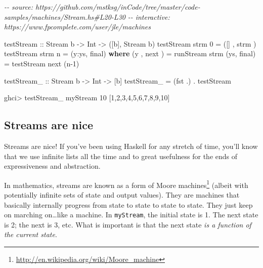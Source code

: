 \documentclass[]{article}
\newenvironment{Shaded}{}{}
\newcommand{\CommentTok}[1]{\textcolor[rgb]{0.38,0.63,0.69}{\textit{#1}}}
\newcommand{\DataTypeTok}[1]{\textcolor[rgb]{0.56,0.13,0.00}{#1}}
\newcommand{\DecValTok}[1]{\textcolor[rgb]{0.25,0.63,0.44}{#1}}
\newcommand{\FunctionTok}[1]{\textcolor[rgb]{0.02,0.16,0.49}{#1}}
\newcommand{\KeywordTok}[1]{\textcolor[rgb]{0.00,0.44,0.13}{\textbf{#1}}}
\newcommand{\NormalTok}[1]{#1}
\newcommand{\OperatorTok}[1]{\textcolor[rgb]{0.40,0.40,0.40}{#1}}
\newcommand{\OtherTok}[1]{\textcolor[rgb]{0.00,0.44,0.13}{#1}}
\renewcommand{\href}[2]{#2\footnote{\url{#1}}}
\begin{document}
\begin{Shaded}
\begin{Highlighting}[]
\CommentTok{{-}{-} source: https://github.com/mstksg/inCode/tree/master/code{-}samples/machines/Stream.hs\#L20{-}L30}
\CommentTok{{-}{-} interactive: https://www.fpcomplete.com/user/jle/machines}

\OtherTok{testStream ::} \DataTypeTok{Stream}\NormalTok{ b }\OtherTok{{-}\textgreater{}} \DataTypeTok{Int} \OtherTok{{-}\textgreater{}}\NormalTok{ ([b], }\DataTypeTok{Stream}\NormalTok{ b)}
\NormalTok{testStream strm }\DecValTok{0} \OtherTok{=}\NormalTok{ ([]  , strm )}
\NormalTok{testStream strm n }\OtherTok{=}\NormalTok{ (y}\OperatorTok{:}\NormalTok{ys, final)}
  \KeywordTok{where}
\NormalTok{    (y , next )   }\OtherTok{=}\NormalTok{ runStream  strm}
\NormalTok{    (ys, final)   }\OtherTok{=}\NormalTok{ testStream next (n}\OperatorTok{{-}}\DecValTok{1}\NormalTok{)}

\OtherTok{testStream\_ ::} \DataTypeTok{Stream}\NormalTok{ b }\OtherTok{{-}\textgreater{}} \DataTypeTok{Int} \OtherTok{{-}\textgreater{}}\NormalTok{ [b]}
\NormalTok{testStream\_ }\OtherTok{=}\NormalTok{ (}\FunctionTok{fst} \OperatorTok{.}\NormalTok{) }\OperatorTok{.}\NormalTok{ testStream}
\end{Highlighting}
\end{Shaded}

\begin{Shaded}
\begin{Highlighting}[]
\NormalTok{ghci}\OperatorTok{\textgreater{}}\NormalTok{ testStream\_ myStream }\DecValTok{10}
\NormalTok{[}\DecValTok{1}\NormalTok{,}\DecValTok{2}\NormalTok{,}\DecValTok{3}\NormalTok{,}\DecValTok{4}\NormalTok{,}\DecValTok{5}\NormalTok{,}\DecValTok{6}\NormalTok{,}\DecValTok{7}\NormalTok{,}\DecValTok{8}\NormalTok{,}\DecValTok{9}\NormalTok{,}\DecValTok{10}\NormalTok{]}
\end{Highlighting}
\end{Shaded}

\subsection{Streams are nice}\label{streams-are-nice}

Streams are nice! If you've been using Haskell for any stretch of time, you'll
know that we use infinite lists all the time and to great usefulness for the
ends of expressiveness and abstraction.

In mathematics, streams are known as a form of
\href{http://en.wikipedia.org/wiki/Moore_machine}{Moore machines} (albeit with
potentially infinite sets of state and output values). They are machines that
basically internally progress from state to state to state to state. They just
keep on marching on\ldots like a machine. In \texttt{myStream}, the initial
state is 1. The next state is 2; the next is 3, etc. What is important is that
the next state \emph{is a function of the current state}.
\end{document}
